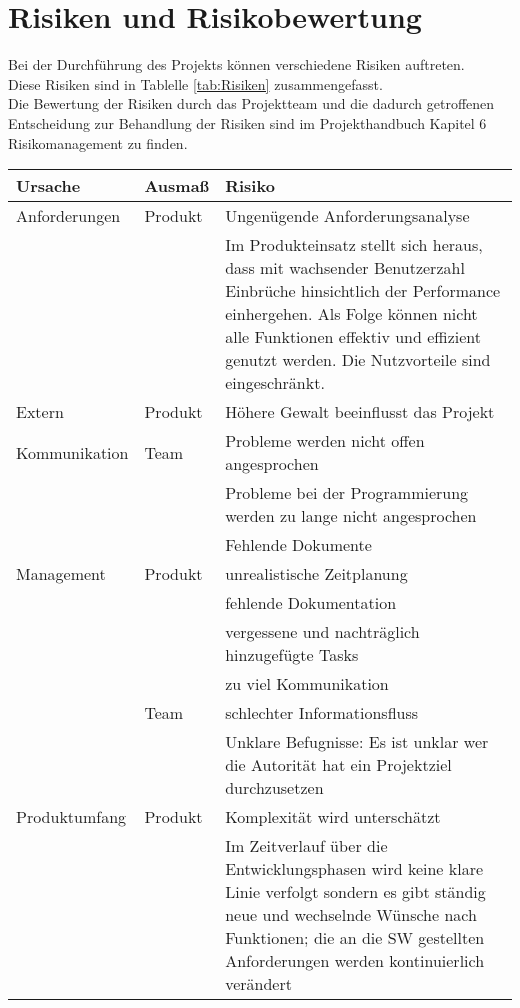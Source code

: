 \chapter{Risiken und Risikobewertung}
Bei der Durchführung des Projekts können verschiedene Risiken auftreten. \\
Diese Risiken sind in Tablelle \ref{tab:Risiken} zusammengefasst. \\
Die Bewertung der Risiken durch das Projektteam und die dadurch getroffenen Entscheidung zur Behandlung der Risiken sind im Projekthandbuch Kapitel 6 Risikomanagement zu finden.
\begin{table}
\centering
\scriptsize
\begin{tabularx}{\textwidth}{|l|l|X|} 
\hline
\textbf{Ursache} & \textbf{Ausmaß} & \textbf{Risiko} \\
\hline
Anforderungen & Produkt & Ungenügende Anforderungsanalyse  \\ 
\hline
 &  & Im Produkteinsatz stellt sich heraus, dass mit wachsender Benutzerzahl Einbrüche hinsichtlich der Performance einhergehen. Als Folge können nicht alle Funktionen effektiv und effizient genutzt werden. Die Nutzvorteile sind eingeschränkt.  \\ 
\hline
Extern & Produkt & Höhere Gewalt beeinflusst das Projekt  \\ 
\hline
Kommunikation & Team & Probleme werden nicht offen angesprochen \\ 
\hline
 &  & Probleme bei der Programmierung werden zu lange nicht angesprochen \\ 
\hline
 &  & Fehlende Dokumente\\ 
\hline
Management & Produkt & unrealistische Zeitplanung \\ 
\hline
 &  & fehlende Dokumentation \\ 
\hline
 &  & vergessene und nachträglich hinzugefügte Tasks \\ 
\hline
 &  & zu viel Kommunikation\\ 
\hline
 & Team & schlechter Informationsfluss \\ 
\hline
 &  & Unklare Befugnisse: Es ist unklar wer die Autorität hat ein Projektziel durchzusetzen  \\ 
\hline
Produktumfang & Produkt & Komplexität wird unterschätzt \\ 
\hline
 &  & Im Zeitverlauf über die Entwicklungsphasen wird keine klare Linie verfolgt sondern es gibt ständig neue und wechselnde Wünsche nach Funktionen; die an die SW gestellten Anforderungen werden kontinuierlich verändert\\ 

\end{tabularx}
\end{table}
